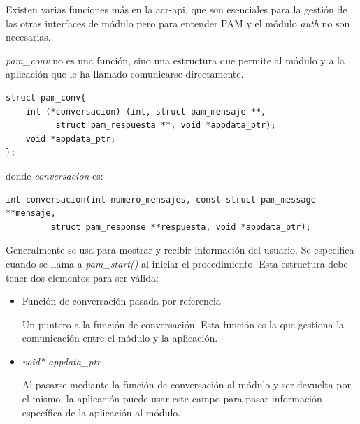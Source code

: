 \documentclass[twoside, titlepage, 12pt, a4paper]{article}
\begin{document}
Existen varias funciones más en la \gls{acr-api}, que son esenciales para la gestión de las otras interfaces de módulo pero para entender PAM y el módulo \textit{auth} no son necesarias.\par
\textit{pam\_conv} no es una función, sino una estructura que permite al módulo y a la aplicación que le ha llamado comunicarse directamente.
\begin{lstlisting}
struct pam_conv{
    int (*conversacion) (int, struct pam_mensaje **,
          struct pam_respuesta **, void *appdata_ptr);
    void *appdata_ptr;
};
\end{lstlisting}
donde \textit{conversacion} es:
\begin{lstlisting}
int conversacion(int numero_mensajes, const struct pam_message **mensaje,
		 struct pam_response **respuesta, void *appdata_ptr);
\end{lstlisting}
Generalmente se usa para mostrar y recibir información del usuario. Se especifica cuando se llama a \textit{pam\_start()} al iniciar el procedimiento. Esta estructura debe tener dos elementos para ser válida:
\begin{itemize}
	\item{Función de conversación pasada por referencia}\par Un puntero a la función de conversación. Esta función es la que gestiona la comunicación entre el módulo y la aplicación.
	\item{\textit{void* appdata\_ptr}}\par
		Al pasarse mediante la función de conversación al módulo y ser devuelta por el mismo, la aplicación puede usar este campo para pasar información específica de la aplicación al módulo.
\end{itemize}
\end{document}
